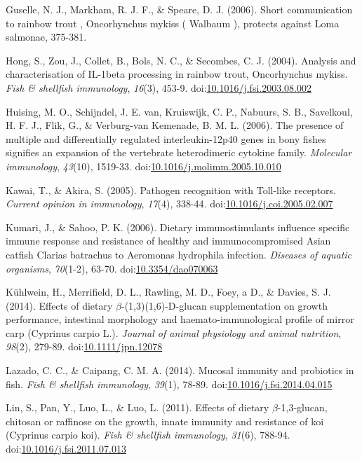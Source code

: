 \documentclass[12pt,letterpaper,oneside]{scrbook}
\begin{document}
Guselle, N. J., Markham, R. J. F., \& Speare, D. J. (2006). Short
communication to rainbow trout , Oncorhynchus mykiss ( Walbaum ),
protects against Loma salmonae, 375-381.

Hong, S., Zou, J., Collet, B., Bols, N. C., \& Secombes, C. J. (2004).
Analysis and characterisation of IL-1beta processing in rainbow trout,
Oncorhynchus mykiss. \emph{Fish \& shellfish immunology}, \emph{16}(3),
453-9.
doi:\href{http://dx.doi.org/10.1016/j.fsi.2003.08.002}{10.1016/j.fsi.2003.08.002}

Huising, M. O., Schijndel, J. E. van, Kruiswijk, C. P., Nabuurs, S. B.,
Savelkoul, H. F. J., Flik, G., \& {Verburg-van Kemenade}, B. M. L.
(2006). The presence of multiple and differentially regulated
interleukin-12p40 genes in bony fishes signifies an expansion of the
vertebrate heterodimeric cytokine family. \emph{Molecular immunology},
\emph{43}(10), 1519-33.
doi:\href{http://dx.doi.org/10.1016/j.molimm.2005.10.010}{10.1016/j.molimm.2005.10.010}

Kawai, T., \& Akira, S. (2005). Pathogen recognition with Toll-like
receptors. \emph{Current opinion in immunology}, \emph{17}(4), 338-44.
doi:\href{http://dx.doi.org/10.1016/j.coi.2005.02.007}{10.1016/j.coi.2005.02.007}

Kumari, J., \& Sahoo, P. K. (2006). Dietary immunostimulants influence
specific immune response and resistance of healthy and immunocompromised
Asian catfish Clarias batrachus to Aeromonas hydrophila infection.
\emph{Diseases of aquatic organisms}, \emph{70}(1-2), 63-70.
doi:\href{http://dx.doi.org/10.3354/dao070063}{10.3354/dao070063}

Kühlwein, H., Merrifield, D. L., Rawling, M. D., Foey, a D., \& Davies,
S. J. (2014). Effects of dietary \(\beta\)-(1,3)(1,6)-D-glucan
supplementation on growth performance, intestinal morphology and
haemato-immunological profile of mirror carp (Cyprinus carpio L.).
\emph{Journal of animal physiology and animal nutrition}, \emph{98}(2),
279-89.
doi:\href{http://dx.doi.org/10.1111/jpn.12078}{10.1111/jpn.12078}

Lazado, C. C., \& Caipang, C. M. A. (2014). Mucosal immunity and
probiotics in fish. \emph{Fish \& shellfish immunology}, \emph{39}(1),
78-89.
doi:\href{http://dx.doi.org/10.1016/j.fsi.2014.04.015}{10.1016/j.fsi.2014.04.015}

Lin, S., Pan, Y., Luo, L., \& Luo, L. (2011). Effects of dietary
\(\beta\)-1,3-glucan, chitosan or raffinose on the growth, innate
immunity and resistance of koi (Cyprinus carpio koi). \emph{Fish \&
shellfish immunology}, \emph{31}(6), 788-94.
doi:\href{http://dx.doi.org/10.1016/j.fsi.2011.07.013}{10.1016/j.fsi.2011.07.013}
\end{document}
